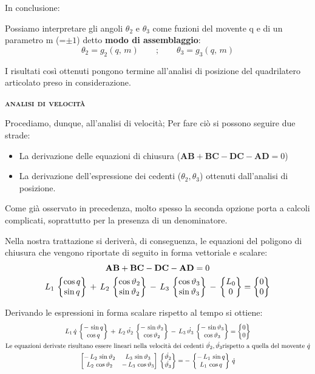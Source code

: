 	In conclusione:
	
	Possiamo interpretare gli angoli $\theta_2$ e $\theta_3$ come fuzioni del movente q e di un parametro m (=$ \pm 1$) detto \textbf{modo di assemblaggio}:
	\begin{equation*}
	\theta_2 = g_2(q,\,m)\qquad;\qquad\theta_3 = g_3(q,\,m)
	\end{equation*}
	
	
	I risultati così ottenuti pongono termine all'analisi di posizione del quadrilatero articolato preso in considerazione.
	
	\begin{center}
			{\scshape{\bfseries analisi di velocità}}
	\end{center}
			
	
	Procediamo, dunque, all'analisi di velocità; Per fare ciò si possono seguire due strade: 
	\begin{itemize}
		\item La derivazione delle equazioni di chiusura ($\mathbf{AB} + \mathbf{BC} - \mathbf{DC} - \mathbf{AD} = 0$)
		\item La derivazione dell'espressione dei cedenti ($\theta_2, \theta_3$) ottenuti dall'analisi di posizione.
	\end{itemize}
	
	Come già osservato in precedenza, molto spesso la seconda opzione porta a calcoli complicati, soprattutto per la presenza di un denominatore.
	
	Nella nostra trattazione si deriverà, di conseguenza, le equazioni del poligono di chiusura che vengono riportate di seguito in forma vettoriale e scalare:
	\begin{gather*}
		\mathbf{AB} + \mathbf{BC} - \mathbf{DC} - \mathbf{AD} = 0\\
		L_1\,\begin{Bmatrix}\cos{q}\\\sin{q}\end{Bmatrix}\,+\,L_2\,\begin{Bmatrix}\cos{\vartheta_2}\\\sin{\vartheta_2}\end{Bmatrix}\,-\,L_3\,\begin{Bmatrix}\cos{\vartheta_3}\\\sin{\vartheta_3}\end{Bmatrix}\,-\,\begin{Bmatrix}L_0\\0\end{Bmatrix} = \begin{Bmatrix}0\\0\end{Bmatrix}
	\end{gather*}
	
	Derivando le espressioni in forma scalare rispetto al tempo si ottiene:
	\begin{gather*}
	L_1\,\dot{q}\,\begin{Bmatrix}-\,\sin{q}\\\cos{q}\end{Bmatrix}\,+\,L_2\,\dot{\vartheta_2}\,\begin{Bmatrix}-\,\sin{\vartheta_2}\\\cos{\vartheta_2}\end{Bmatrix}\,-\,L_3\,\dot{\vartheta_3}\,\begin{Bmatrix}-\,\sin{\vartheta_3}\\\cos{\vartheta_3}\end{Bmatrix} = \begin{Bmatrix}0\\0\end{Bmatrix}\\
	\text{Le equazioni derivate risultano essere lineari nella velocità dei cedenti $\dot{\vartheta_2}, \dot{\vartheta_3}$rispetto a quella del movente $\dot{q}$}\\
	\begin{bmatrix}-\,L_2\,\sin{\vartheta_2} & L_3\,\sin{\vartheta_3}\\ L_2\,\cos{\vartheta_2} & -\,L_3\,\cos{\vartheta_3}\end{bmatrix}\,\begin{Bmatrix}\dot{\vartheta_2}\\\dot{\vartheta_3}\end{Bmatrix} = -\,\begin{Bmatrix}-\,L_1\,\sin{q}\\L_1\,\cos{q}\end{Bmatrix}\,\dot{q}
	\end{gather*}
	
